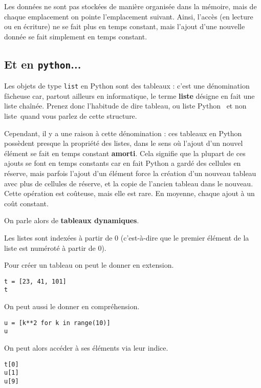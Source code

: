 \begin{defi}
Les données ne sont pas stockées de manière organisée dans la mémoire, 
mais de chaque emplacement on pointe l'emplacement suivant. 
    Ainsi, l'accès (en lecture ou en écriture) ne se fait plus en temps constant, mais l'ajout d'une nouvelle donnée se fait simplement en temps constant. 
\end{defi}

\subsection{Et en \texttt{python}...}

Les objets de type \texttt{list} en Python sont des tableaux : c'est une 
dénomination fâcheuse car, partout ailleurs en informatique, le terme
\textbf{liste} désigne en fait une liste chaînée. Prenez donc
l'habitude de dire \og tableau\fg, ou \og liste Python \fg\ et non \og liste\fg\ quand vous parlez de cette
structure.

Cependant, il y a une raison à cette dénomination : ces tableaux en Python possèdent presque 
la propriété des listes, dans le sens où l'ajout d'un nouvel élément se fait en temps constant 
\textbf{amorti}. Cela signifie que la plupart de ces ajouts se font en temps constants car en fait 
Python a \og gardé des cellules en réserve\fg, mais parfois l'ajout d'un élément force la création 
d'un nouveau tableau avec plus de cellules de réserve, et la copie de l'ancien tableau dans le 
nouveau. Cette opération est coûteuse, mais elle 
est rare. En moyenne, chaque ajout à un coût constant.

On parle alors de \textbf{tableaux dynamiques}.


\begin{remarque}
Les listes sont indexées à partir de 0 (c'est-à-dire que le premier élément de la liste est numéroté à partir de 0). 
\end{remarque}

Pour créer un tableau on peut le donner en extension.

\begin{lstlisting}
t = [23, 41, 101]
t
\end{lstlisting}

On peut aussi le donner en compréhension.

\begin{lstlisting}
u = [k**2 for k in range(10)]
u
\end{lstlisting}
On peut alors accéder à ses éléments via leur indice.
\begin{lstlisting}
t[0]
u[1]
u[9]
\end{lstlisting}

